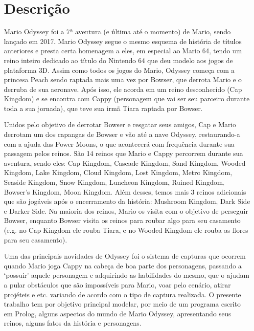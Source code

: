 \chapter{Descrição}
\label{sec-desc}

\par Mario Odyssey foi a 7ª aventura (e última até o momento) de Mario, sendo lançado em 2017. Mario Odyssey segue o mesmo esquema de história de títulos anteriores e presta certa homenagem a eles, em especial ao Mario 64, tendo um reino inteiro dedicado ao título do Nintendo 64 que deu modelo aos jogos de plataforma 3D. Assim como todos os jogos do Mario, Odyssey começa com a princesa Peach sendo raptada mais uma vez por Bowser, que derrota Mario e o derruba de sua aeronave. Após isso, ele acorda em um reino desconhecido (Cap Kingdom) e se encontra com Cappy (personagem que vai ser seu parceiro durante toda a sua jornada), que teve sua irmã Tiara raptada por Bowser.
\par Unidos pelo objetivo de derrotar Bowser e resgatar seus amigos, Cap e Mario derrotam um dos capangas de Bowser e vão até a nave Odyssey, restaurando-a com a ajuda das Power Moons, o que acontecerá com frequência durante sua passagem pelos reinos. São 14 reinos que Mario e Cappy percorrem durante sua aventura, sendo eles: Cap Kingdom, Cascade Kingdom, Sand Kingdom, Wooded Kingdom, Lake Kingdom, Cloud Kingdom, Lost Kingdom, Metro Kingdom, Seaside Kingdom, Snow Kingdom, Luncheon Kingdom, Ruined Kingdom, Bowser's Kingdom, Moon Kingdom. Além desses, temos mais 3 reinos adicionais que são jogáveis após o encerramento da história: Mushroom Kingdom, Dark Side e Darker Side. Na maioria dos reinos, Mario os visita com o objetivo de perseguir Bowser, enquanto Bowser visita os reinos para roubar algo para seu casamento (e.g. no Cap Kingdom ele rouba Tiara, e no Wooded Kingdom ele rouba as flores para seu casamento). 
\par Uma das principais novidades de Odyssey foi o sistema de capturas que ocorrem quando Mario joga Cappy na cabeça de boa parte dos personagens, passando a ‘possuir’ aquele personagem e adquirindo as habilidades do mesmo, que o ajudam a pular obstáculos que são impossíveis para Mario, voar pelo cenário, atirar projéteis e etc. variando de acordo com o tipo de captura realizada.
O presente trabalho tem por objetivo principal modelar, por meio de um programa escrito em Prolog, alguns aspectos do mundo de Mario Odyssey, apresentando seus reinos, alguns fatos da história e personagens.
